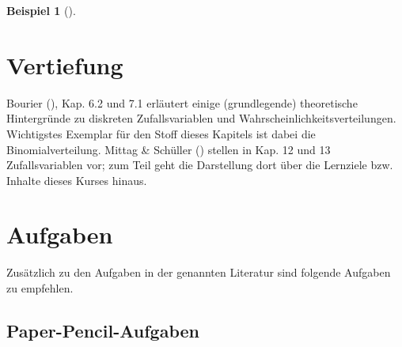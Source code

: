 \documentclass[
  ngerman,
  letterpaper,
  twoside,
  open=any]{scrbook}
\theoremstyle{definition}
\newtheorem{example}{Beispiel}[chapter]
\theoremstyle{plain}
\theoremstyle{definition}
\theoremstyle{definition}
\theoremstyle{remark}
\begin{document}
\begin{example}[]
{}

\section{Vertiefung}\label{vertiefung-1}

Bourier (), Kap. 6.2 und 7.1 erläutert
einige (grundlegende) theoretische Hintergründe zu diskreten
Zufallsvariablen und Wahrscheinlichkeitsverteilungen. Wichtigstes
Exemplar für den Stoff dieses Kapitels ist dabei die Binomialverteilung.
Mittag \& Schüller () stellen in Kap. 12
und 13 Zufallsvariablen vor; zum Teil geht die Darstellung dort über die
Lernziele bzw. Inhalte dieses Kurses hinaus.

\section{Aufgaben}\label{aufgaben-4}

Zusätzlich zu den Aufgaben in der genannten Literatur sind folgende
Aufgaben zu empfehlen.

\subsection{Paper-Pencil-Aufgaben}\label{paper-pencil-aufgaben-3}


\end{example}
\end{document}

